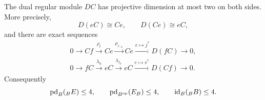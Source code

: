 \begin{proposition}\label{a:dual-dimensions}
The dual regular module \(DC\) has projective dimension at most two
on both sides.  More precisely,
\[
D(eC)\cong Ce,\qquad D(Ce)\cong eC,
\]
and there are exact sequences
\begin{align}
0\longrightarrow Cf\xrightarrow{\rho_t}Ce
 \xrightarrow{\rho_{\ell_{-2}}}Ce
 \xrightarrow{e\mapsto j^*}D(fC)\longrightarrow0,
\label{a:left-dual-resolution}\\
0\longrightarrow fC\xrightarrow{\lambda_u}eC
 \xrightarrow{\lambda_{\ell_0}}eC
 \xrightarrow{e\mapsto v^*}D(Cf)\longrightarrow0.
\label{a:right-dual-resolution}
\end{align}
Consequently
\begin{equation}
\operatorname{pd}_B({}_B E)\le4,\qquad
\operatorname{pd}_{B^{\mathrm{op}}}(E_B)\le4,\qquad
\operatorname{id}_B({}_B B)\le4.
\label{a:dimension-bounds}
\end{equation}
\end{proposition}

